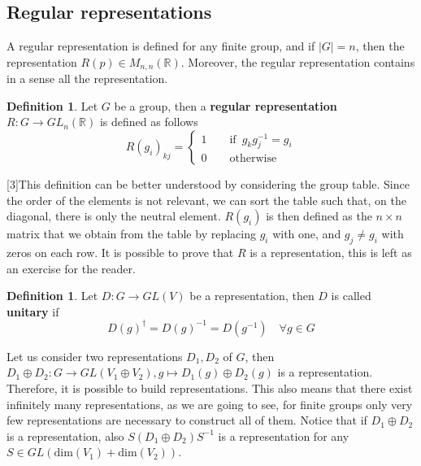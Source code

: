 \documentclass[12pt]{book}
\theoremstyle{plain}
\newcommand{\R}{\mathbb{R}}
\theoremstyle{definition}
\newtheorem{dfn}[thm]{Definition}
\theoremstyle{remark}
\begin{document}
\subsection{Regular representations}\label{section:regularrepresentation}
A regular representation is defined for any finite group, and if $|G|=n$, then the representation $R(p)\in M_{n,n}(\R)$. Moreover, the regular representation contains in a sense all the representation.
\begin{dfn}
Let $G$ be a group, then a \textbf{regular representation} $R:G\to GL_n(\R)$ is defined as follows
\[R(g_i)_{kj} = \begin{cases}
1\qquad \text{if}\,\,\, g_kg_j^{-1} = g_i\\
0 \qquad \text{otherwise}
\end{cases}\]
\end{dfn}
[3]This definition can be better understood by considering the group table. Since the order of the elements is not relevant, we can sort the table such that, on the diagonal, there is only the neutral element. $R(g_i)$ is then defined as the $n\times n$ matrix that we obtain from the table by replacing $g_i$ with one, and $g_j\neq g_i$ with zeros on each row.
It is possible to prove that $R$ is a representation, this is left as an exercise for the reader.
\begin{dfn}
Let $D:G\to GL(V)$ be a representation, then $D$ is called \textbf{unitary} if
\[D(g)^\dagger = D(g)^{-1} = D(g^{-1})\quad \forall g \in G\]
\end{dfn}
Let us consider two representations $D_1,D_2$ of $G$, then $D_1\oplus D_2:G \to GL(V_1\oplus V_2),g\mapsto D_1(g)\oplus D_2(g)$ is a representation. Therefore, it is possible to build representations. This also means that there exist infinitely many representations, as we are going to see, for finite groups only very few representations are necessary to construct all of them. Notice that if $D_1\oplus D_2$ is a representation, also $S(D_1\oplus D_2)S^{-1}$ is a representation for any $S\in GL(\text{dim}(V_1)+\text{dim}(V_2))$. 
\end{document}
